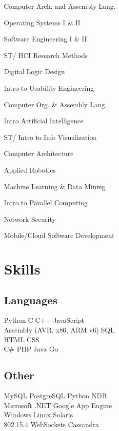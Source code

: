 \documentclass[letterpaper]{deedy-resume} %
\begin{document}
\begin{minipage}[t]{0.33\textwidth}
\begin{tightitemize}
\item Computer Arch. and Assembly Lang.
\item Operating Systems I \& II
\item Software Engineering I \& II
\item ST/ HCI Research Methods
\item Digital Logic Design
\item Intro to Usability Engineering
\item Computer Org. \& Assembly Lang.
\item Intro Artificial Intelligence
\item ST/ Intro to Info Visualization
\item Computer Architecture
\item Applied Robotics
\item Machine Learning \& Data Mining
\item Intro to Parallel Computing
\item Network Security
\item Mobile/Cloud Software Development
\end{tightitemize}

\sectionspace %


\section{Skills}

\subsection{Languages}

Python \textbullet{} C \textbullet{} C++ \textbullet{} JavaScript\\
Assembly (AVR, x86, ARM v6) \textbullet{} SQL\\
HTML \textbullet{} CSS\\
C\# \textbullet{} PHP \textbullet{} Java \textbullet{} Go

\subsection{Other}
MySQL \textbullet{} PostgreSQL \textbullet{} Python NDB\\
Microsoft .NET \textbullet{} Google App Engine\\
Windows \textbullet{} Linux \textbullet{} Solaris\\
802.15.4 \textbullet{} WebSockets \textbullet{} Cassandra\\


\sectionspace %


\end{minipage} %
\end{document}
